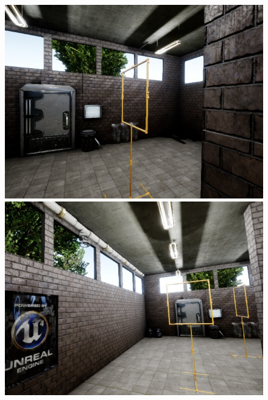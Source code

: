 \documentclass{article}
\begin{document}
\begin{figure}[htbp]
	\centering
	\begin{minipage}{0.3\linewidth}
		\includegraphics[width=\linewidth]{size_examples/001-005 (1).jpg}
	\end{minipage}
	\hfill
	\begin{minipage}{0.3\linewidth}
		\includegraphics[width=\linewidth]{size_examples/001-005 (2).jpg}
	\end{minipage}
	\hfill
	\begin{minipage}{0.3\linewidth}

\end{minipage}
\end{figure}
\end{document}
